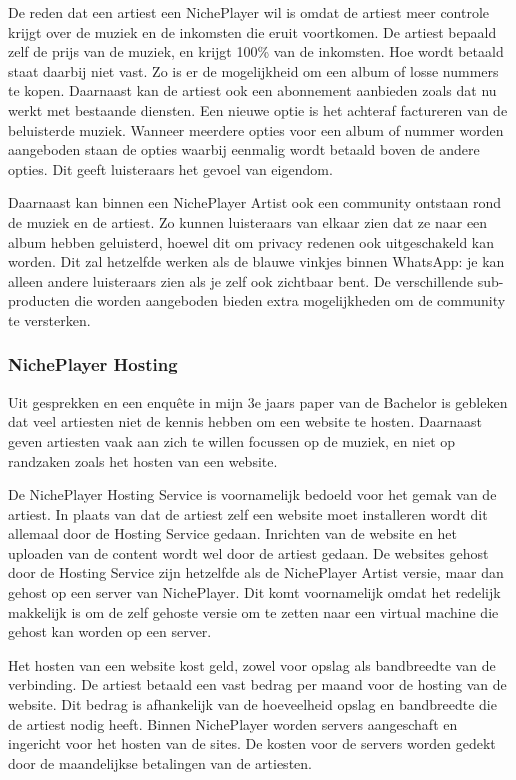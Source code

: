 De reden dat een artiest een NichePlayer wil is omdat de artiest meer controle krijgt over de muziek en de inkomsten die eruit voortkomen. De artiest bepaald zelf de prijs van de muziek, en krijgt 100\% van de inkomsten. Hoe wordt betaald staat daarbij niet vast. Zo is er de mogelijkheid om een album of losse nummers te kopen. Daarnaast kan de artiest ook een abonnement aanbieden zoals dat nu werkt met bestaande diensten. Een nieuwe optie is het achteraf factureren van de beluisterde muziek. Wanneer meerdere opties voor een album of nummer worden aangeboden staan de opties waarbij eenmalig wordt betaald boven de andere opties. Dit geeft luisteraars het gevoel van eigendom.

Daarnaast kan binnen een NichePlayer Artist ook een community ontstaan rond de muziek en de artiest. Zo kunnen luisteraars van elkaar zien dat ze naar een album hebben geluisterd, hoewel dit om privacy redenen ook uitgeschakeld kan worden. Dit zal hetzelfde werken als de blauwe vinkjes binnen WhatsApp: je kan alleen andere luisteraars zien als je zelf ook zichtbaar bent. De verschillende sub-producten die worden aangeboden bieden extra mogelijkheden om de community te versterken.

\subsubsection*{NichePlayer Hosting}
Uit gesprekken en een enquête in mijn 3e jaars paper van de Bachelor is gebleken dat veel artiesten niet de kennis hebben om een website te hosten. Daarnaast geven artiesten vaak aan zich te willen focussen op de muziek, en niet op randzaken zoals het hosten van een website.

De NichePlayer Hosting Service is voornamelijk bedoeld voor het gemak van de artiest. In plaats van dat de artiest zelf een website moet installeren wordt dit allemaal door de Hosting Service gedaan. Inrichten van de website en het uploaden van de content wordt wel door de artiest gedaan. De websites gehost door de Hosting Service zijn hetzelfde als de NichePlayer Artist versie, maar dan gehost op een server van NichePlayer. Dit komt voornamelijk omdat het redelijk makkelijk is om de zelf gehoste versie om te zetten naar een virtual machine die gehost kan worden op een server.

Het hosten van een website kost geld, zowel voor opslag als bandbreedte van de verbinding. De artiest betaald een vast bedrag per maand voor de hosting van de website. Dit bedrag is afhankelijk van de hoeveelheid opslag en bandbreedte die de artiest nodig heeft. Binnen NichePlayer worden servers aangeschaft en ingericht voor het hosten van de sites. De kosten voor de servers worden gedekt door de maandelijkse betalingen van de artiesten.

